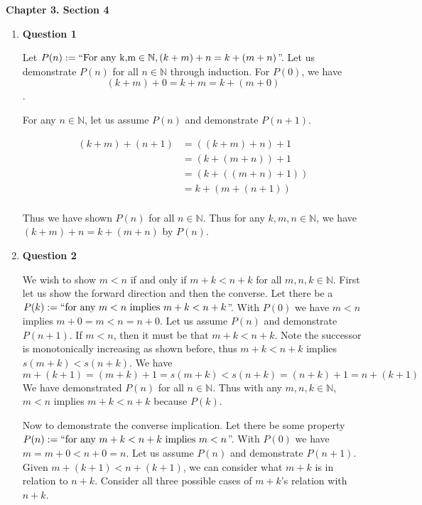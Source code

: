 \documentclass{article}
\begin{document}
	
	
	\medskip
	\textbf{Chapter 3. Section 4}
	\medskip 
		
	\begin{enumerate}
		\item \textbf{Question 1}
		\medskip
		
		Let $P(n) := ``\text{For any k,m} \in \mathbb{N}, (k + m) + n  = k + (m + n)$''. Let us demonstrate $P(n)$ for all $n \in \mathbb{N}$ through induction. For $P(0)$, we have $$(k + m) + 0 = k + m = k + (m + 0)$$.
		
		\medskip
		For any $n \in \mathbb{N}$, let us assume $P(n)$ and demonstrate $P(n + 1)$.
		
		\begin{align*}
			(k + m) + (n + 1) &= ((k + m) + n) + 1\\
			&= (k + (m + n)) + 1\\
			&= (k + ((m + n) + 1))\\
			&= k + (m + (n + 1))\\
		\end{align*}
		
		Thus we have shown $P(n)$ for all $n \in \mathbb{N}$. Thus for any $k,m,n \in \mathbb{N}$, we have $(k + m) + n = k + (m + n)$ by $P(n)$.
		
		\medskip
		\item \textbf{Question 2}
		\medskip
		
		We wish to show $m < n$ if and only if $m + k < n + k$ for all $m,n,k \in \mathbb{N}$. First let us show the forward direction and then the converse. Let there be a $P(k) := ``\text{for any } m < n \text{ implies } m + k < n + k$''. With $P(0)$ we have $m < n$ implies $m + 0 = m < n = n + 0$. Let us assume $P(n)$ and demonstrate $P(n + 1)$. If $m < n$, then it must be that $m + k < n + k$. Note the successor is monotonically increasing as shown before, thus $m + k < n + k$ implies $s(m + k) < s(n + k)$. We have $$m + (k + 1) = (m + k) + 1 = s(m + k) < s(n + k) = (n + k) + 1 = n + (k + 1)$$
		 We have demonstrated $P(n)$ for all $n \in \mathbb{N}$. Thus with any $m,n,k \in \mathbb{N}$, $m < n$ implies $m + k < n + k$ because $P(k)$.
		
		\medskip
		
		Now to demonstrate the converse implication. Let there be some property $P(n) := ``\text{for any } m + k < n + k \text{ implies } m < n$''. With $P(0)$ we have $m = m + 0 < n + 0 = n$. Let us assume $P(n)$ and demonstrate $P(n + 1)$. Given $m + (k + 1) < n + (k + 1)$, we can consider what $m + k$ is in relation to $n + k$. Consider all three possible cases of $m + k$'s relation with $n + k$.
		

\end{enumerate}
\end{document}
